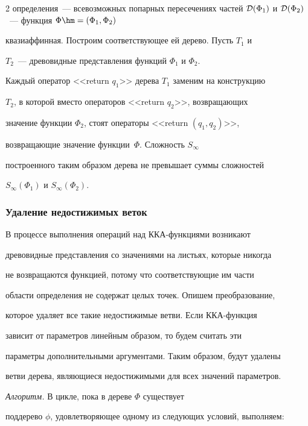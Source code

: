 \begin{multicols}{2}
определения~--- всевозможных попарных пересечениях частей ${\cal

D}(\Phi_1)$ и ${\cal D}(\Phi_2)$~--- функция $\Phi\hm=(\Phi_1,\Phi_2)$

квазиаффинная. Построим соответствующее ей дерево. Пусть $T_1$ и

$T_2$~--- древовидные представления функций $\Phi_1$ и $\Phi_2$.

Каждый оператор <<return $q_1$>> дерева $T_1$ заменим на конструкцию

$T_2$, в которой вмес\-то операторов <<return $q_2$>>, возвращающих

значение функции $\Phi_2$, стоят операторы <<return $(q_1,q_2)$>>,

возвращающие значение функции~$\Phi$. Сложность $S_\infty$

построенного таким образом дерева не превышает суммы сложностей

$S_\infty(\Phi_1)$ и $S_\infty(\Phi_2)$.





\subsubsection{Удаление недостижимых веток} %



В процессе выполнения операций над ККА-функ\-ци\-ями возникают

древовидные представления со значениями на листьях, которые никогда

не возвращаются функцией, потому что соответствующие им части

области определения не содержат целых точек. Опишем преобразование,

которое удаляет все такие недостижимые ветви. Если ККА-функция

зависит от параметров линейным образом, то будем считать эти

параметры дополнительными аргументами. Таким образом, будут удалены

ветви дерева, являющиеся недостижимыми для всех значений параметров.



\textit{Алгоритм.} В цикле, пока в дереве $\Phi$ существует 

поддерево $\phi$, удовлетворяющее одному из сле\-ду\-ющих условий, выполняем:

\begin{enumerate}


\end{enumerate}
\end{multicols}
